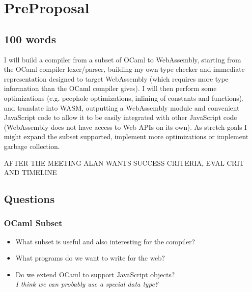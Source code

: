 \documentclass{report}
\title{\thetitle}
\author{Paul Durbaba}
\begin{document}
\maketitle
\tableofcontents

\chapter{PreProposal}

\section{100 words}

I will build a compiler from a subset of OCaml to WebAssembly, starting from the OCaml compiler lexer/parser, building my own type checker and immediate representation designed to target WebAssembly (which requires more type information than the OCaml compiler gives). I will then perform some optimizations (e.g. peephole optimizations, inlining of constants and functions), and translate into WASM, outputting a WebAssembly module and convenient JavaScript code to allow it to be easily integrated with other JavaScript code (WebAssembly does not have access to Web APIs on its own). As stretch goals I might expand the subset supported, implement more optimizations or implement garbage collection.

AFTER THE MEETING ALAN WANTS SUCCESS CRITERIA, EVAL CRIT AND TIMELINE

\section{Questions}

\subsection{OCaml Subset}
\begin{itemize}
\item What subset is useful and also interesting for the compiler?
\item What programs do we want to write for the web?
\item Do we extend OCaml to support JavaScript objects?
      \\ \textit{I think we can probably use a special data type?}
\end{itemize}
\end{document}
